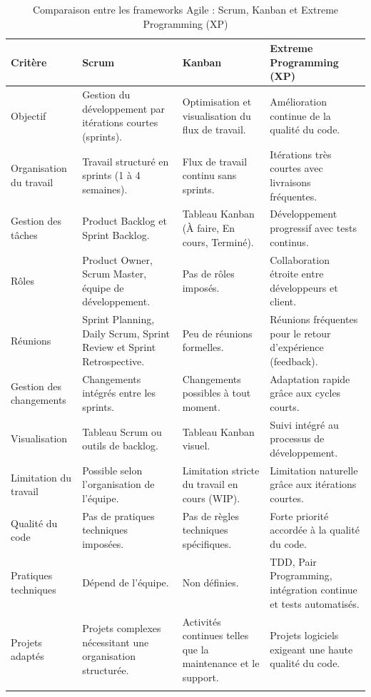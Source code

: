 \renewcommand{\arraystretch}{1.3}

\begin{center}
\begin{longtable}{|p{2cm}|p{4cm}|p{4cm}|p{4cm}|}

\hline
\textbf{Critère} & \textbf{Scrum} & \textbf{Kanban} & \textbf{Extreme Programming (XP)} \\
\hline
\endhead

Objectif &
Gestion du développement par itérations courtes (sprints). &
Optimisation et visualisation du flux de travail. &
Amélioration continue de la qualité du code. \\
\hline

Organisation du travail &
Travail structuré en sprints (1 à 4 semaines). &
Flux de travail continu sans sprints. &
Itérations très courtes avec livraisons fréquentes. \\
\hline

Gestion des tâches &
Product Backlog et Sprint Backlog. &
Tableau Kanban (À faire, En cours, Terminé). &
Développement progressif avec tests continus. \\
\hline

Rôles &
Product Owner, Scrum Master, équipe de développement. &
Pas de rôles imposés. &
Collaboration étroite entre développeurs et client. \\
\hline

Réunions &
Sprint Planning, Daily Scrum, Sprint Review et Sprint Retrospective. &
Peu de réunions formelles. &
Réunions fréquentes pour le retour d'expérience (feedback). \\
\hline

Gestion des changements &
Changements intégrés entre les sprints. &
Changements possibles à tout moment. &
Adaptation rapide grâce aux cycles courts. \\
\hline

Visualisation &
Tableau Scrum ou outils de backlog. &
Tableau Kanban visuel. &
Suivi intégré au processus de développement. \\
\hline

Limitation du travail &
Possible selon l’organisation de l’équipe. &
Limitation stricte du travail en cours (WIP). &
Limitation naturelle grâce aux itérations courtes. \\
\hline

Qualité du code &
Pas de pratiques techniques imposées. &
Pas de règles techniques spécifiques. &
Forte priorité accordée à la qualité du code. \\
\hline

Pratiques techniques &
Dépend de l’équipe. &
Non définies. &
TDD, Pair Programming, intégration continue et tests automatisés. \\
\hline

Projets adaptés &
Projets complexes nécessitant une organisation structurée. &
Activités continues telles que la maintenance et le support. &
Projets logiciels exigeant une haute qualité du code. \\
\hline
\caption{Comparaison entre les frameworks Agile : Scrum, Kanban et Extreme Programming (XP)}
\end{longtable}
\end{center}

